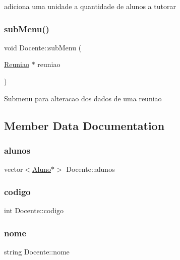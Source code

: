 adiciona uma unidade a quantidade de alunos a tutorar \hypertarget{class_docente_a00b8c20d2bf2f3015efb8710cc4dad89}{}\label{class_docente_a00b8c20d2bf2f3015efb8710cc4dad89} 
\subsubsection{\texorpdfstring{sub\+Menu()}{subMenu()}}
{\footnotesize\ttfamily void Docente\+::sub\+Menu (\begin{DoxyParamCaption}\item[{\hyperlink{class_reuniao}{Reuniao} $\ast$}]{reuniao }\end{DoxyParamCaption})}

Submenu para alteracao dos dados de uma reuniao 

\subsection{Member Data Documentation}
\hypertarget{class_docente_aa0d2dd3fca5eb6eeb6d1a2f75184e09e}{}\label{class_docente_aa0d2dd3fca5eb6eeb6d1a2f75184e09e} 
\subsubsection{\texorpdfstring{alunos}{alunos}}
{\footnotesize\ttfamily vector$<$\hyperlink{class_aluno}{Aluno}$\ast$$>$ Docente\+::alunos\hspace{0.3cm}{\ttfamily [private]}}

\hypertarget{class_docente_aa1db9f8aaf6d2f21b2f418c989629171}{}\label{class_docente_aa1db9f8aaf6d2f21b2f418c989629171} 
\subsubsection{\texorpdfstring{codigo}{codigo}}
{\footnotesize\ttfamily int Docente\+::codigo\hspace{0.3cm}{\ttfamily [private]}}

\hypertarget{class_docente_a66b320a22a0e829473b70f7fe11ac6d9}{}\label{class_docente_a66b320a22a0e829473b70f7fe11ac6d9} 
\subsubsection{\texorpdfstring{nome}{nome}}
{\footnotesize\ttfamily string Docente\+::nome\hspace{0.3cm}{\ttfamily [private]}}

